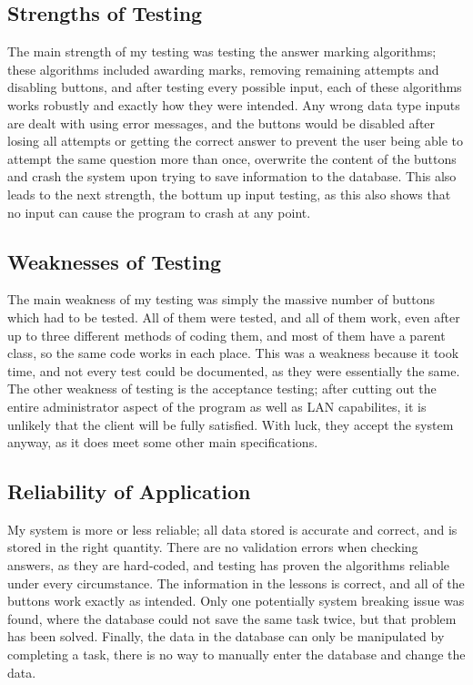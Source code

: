 \subsection{Strengths of Testing}

The main strength of my testing was testing the answer marking algorithms; these algorithms included awarding marks, removing remaining attempts and disabling buttons, and after testing every possible input, each of these algorithms works robustly and exactly how they were intended. Any wrong data type inputs are dealt with using error messages, and the buttons would be disabled after losing all attempts or getting the correct answer to prevent the user being able to attempt the same question more than once, overwrite the content of the buttons and crash the system upon trying to save information to the database. This also leads to the next strength, the bottum up input testing, as this also shows that no input can cause the program to crash at any point.

\subsection{Weaknesses of Testing}

The main weakness of my testing was simply the massive number of buttons which had to be tested. All of them were tested, and all of them work, even after up to three different methods of coding them, and most of them have a parent class, so the same code works in each place. This was a weakness because it took time, and not every test could be documented, as they were essentially the same. The other weakness of testing is the acceptance testing; after cutting out the entire administrator aspect of the program as well as LAN capabilites, it is unlikely that the client will be fully satisfied. With luck, they accept the system anyway, as it does meet some other main specifications.

\subsection{Reliability of Application}

My system is more or less reliable; all data stored is accurate and correct, and is stored in the right quantity. There are no validation errors when checking answers, as they are hard-coded, and testing has proven the algorithms reliable under every circumstance. The information in the lessons is correct, and all of the buttons work exactly as intended. Only one potentially system breaking issue was found, where the database could not save the same task twice, but that problem has been solved. Finally, the data in the database can only be manipulated by completing a task, there is no way to manually enter the database and change the data.

